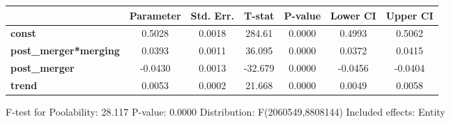 \documentclass{report}
\begin{document}
\begin{center}
\begin{tabular}{lcccccc}
                              & \textbf{Parameter} & \textbf{Std. Err.} & \textbf{T-stat} & \textbf{P-value} & \textbf{Lower CI} & \textbf{Upper CI}  \\
\midrule
\textbf{const}                &       0.5028       &       0.0018       &      284.61     &      0.0000      &       0.4993      &       0.5062       \\
\textbf{post\_merger*merging} &       0.0393       &       0.0011       &      36.095     &      0.0000      &       0.0372      &       0.0415       \\
\textbf{post\_merger}         &      -0.0430       &       0.0013       &     -32.679     &      0.0000      &      -0.0456      &      -0.0404       \\
\textbf{trend}                &       0.0053       &       0.0002       &      21.668     &      0.0000      &       0.0049      &       0.0058       \\
\bottomrule
\end{tabular}
\end{center}

F-test for Poolability: 28.117 \newline
 P-value: 0.0000 \newline
 Distribution: F(2060549,8808144) \newline
  \newline
 Included effects: Entity
\end{document}
